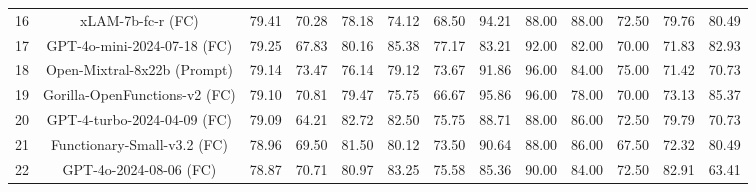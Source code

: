 \documentclass{article}
\begin{document}
\begin{table}[h]
{\begin{tabular}{ccccccccccccc}
16                     & xLAM-7b-fc-r (FC)                              & 79.41                         & 70.28  & 78.18    & 74.12    & 68.50                                                       & 94.21  & 88.00    & 88.00    & 72.50                                                       & 79.76                         & 80.49                       \\
17                     & GPT-4o-mini-2024-07-18 (FC)                    & 79.25                         & 67.83  & 80.16    & 85.38    & 77.17                                                       & 83.21  & 92.00    & 82.00    & 70.00                                                       & 71.83                         & 82.93                       \\
18                     & Open-Mixtral-8x22b (Prompt)                    & 79.14                         & 73.47  & 76.14    & 79.12    & 73.67                                                       & 91.86  & 96.00    & 84.00    & 75.00                                                       & 71.42                         & 70.73                       \\
19                     & Gorilla-OpenFunctions-v2 (FC)                  & 79.10                         & 70.81  & 79.47    & 75.75    & 66.67                                                       & 95.86  & 96.00    & 78.00    & 70.00                                                       & 73.13                         & 85.37                       \\
20                     & GPT-4-turbo-2024-04-09 (FC)                    & 79.09                         & 64.21  & 82.72    & 82.50    & 75.75                                                       & 88.71  & 88.00    & 86.00    & 72.50                                                       & 79.79                         & 70.73                       \\
21                     & Functionary-Small-v3.2 (FC)                    & 78.96                         & 69.50  & 81.50    & 80.12    & 73.50                                                       & 90.64  & 88.00    & 86.00    & 67.50                                                       & 72.32                         & 80.49                       \\
22                     & GPT-4o-2024-08-06 (FC)                         & 78.87                         & 70.71  & 80.97    & 83.25    & 75.58                                                       & 85.36  & 90.00    & 84.00    & 72.50                                                       & 82.91                         & 63.41                       \\

\end{tabular}}
\end{table}
\end{document}
